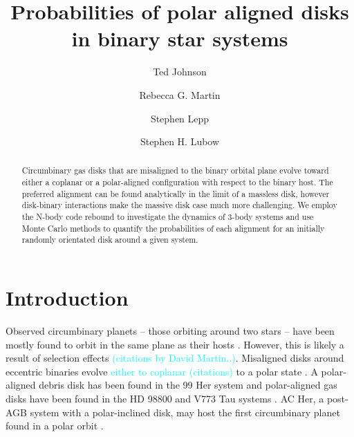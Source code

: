 \documentclass[twocolumn]{aastex631}
\newcommand{\RGM}[1]{\textcolor{cyan}{#1}}
\begin{document}
\title{Probabilities of polar aligned disks in binary star systems}

\author{Ted Johnson}
\author{Rebecca G. Martin}
\author{Stephen Lepp}
\author{Stephen H. Lubow}

\begin{abstract}
    Circumbinary gas disks that are misaligned to the binary orbital plane evolve toward either a coplanar or a polar-aligned configuration with respect to the binary host.
    The preferred alignment can be found analytically
    in the limit of a massless disk, however disk-binary interactions make the massive disk case much more challenging.
    We employ the N-body code {\sc rebound} to investigate the dynamics of  3-body systems and use Monte Carlo methods
    to quantify the probabilities of each alignment for an initially randomly orientated disk around a given system.
\end{abstract}

\section{Introduction}
\label{sec:intro}



Observed circumbinary planets -- those orbiting around two stars -- have been mostly found to orbit in the same plane as
their hosts \citep{doyle2011,orosz2012,welsh2012}. However, this is likely a result of selection effects \RGM{(citations by David Martin..)}.  Misaligned disks around eccentric binaries evolve \RGM{either to coplanar (citations)} to a polar state  \citep{aly2015,martin2017}. A polar-aligned debris disk has been found in the 99 Her system
\citep{kennedy2012} and polar-aligned gas disks have been found in the HD 98800 \citep{kennedy2019} and V773 Tau systems \citep{kenworthy2022}.
AC Her, a post-AGB system with a polar-inclined
disk, may host the first circumbinary planet found in a polar orbit \citep{hillen2015,anugu2023,martin2023}.
\end{document}
